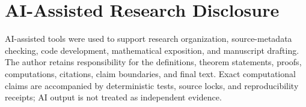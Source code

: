 \documentclass[11pt]{article}
\theoremstyle{definition}
\theoremstyle{remark}
\begin{document}
\section*{AI-Assisted Research Disclosure}
AI-assisted tools were used to support research organization, source-metadata checking, code development, mathematical exposition, and manuscript drafting. The author retains responsibility for the definitions, theorem statements, proofs, computations, citations, claim boundaries, and final text. Exact computational claims are accompanied by deterministic tests, source locks, and reproducibility receipts; AI output is not treated as independent evidence.

\begingroup
\raggedright


\endgroup
\end{document}
